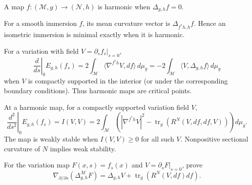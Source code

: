 \begin{definition}
\label{def:chow-iv-k12-harmonic-map}
A map $f:(\mathcal M,g)\to(\mathcal N,h)$ is harmonic when
$\Delta_{g,h}f=0$.
\end{definition}

\begin{example}
\label{ex:chow-iv-k13-minimal-immersion}
For a smooth immersion $f$, its mean curvature vector is
$\Delta_{f^*h,h}f$.  Hence an isometric immersion is minimal exactly when it
is harmonic.
\end{example}

\begin{lemma}
\label{lem:chow-iv-k14-first-variation}
For a variation with field $V=\partial_sf_s|_{s=0}$,
\[
\left.\frac{d}{ds}\right|_{0}E_{g,h}(f_s)=
2\int_{\mathcal M}\langle\nabla^{f^*h}V,df\rangle\,d\mu_g
=-2\int_{\mathcal M}\langle V,\Delta_{g,h}f\rangle\,d\mu_g
\]
when $V$ is compactly supported in the interior (or under the corresponding
boundary conditions).  Thus harmonic maps are critical points.
\end{lemma}

\begin{lemma}
\label{lem:chow-iv-k15-second-variation}
At a harmonic map, for a compactly supported variation field $V$,
\[
\left.\frac{d^2}{ds^2}\right|_0E_{g,h}(f_s)=I(V,V)
=2\int_{\mathcal M}\left(|\nabla^{f^*h}V|^2-
\operatorname{tr}_g(R^N(V,df,df,V))\right)d\mu_g.
\]
The map is weakly stable when $I(V,V)\ge0$ for all such $V$.  Nonpositive
sectional curvature of $N$ implies weak stability.
\end{lemma}

\begin{example}
\label{ex:chow-iv-k16-map-laplacian-linearization}
For the variation map $F(x,s)=f_s(x)$ and $V=\partial_sF|_{s=0}$, prove
\[
\nabla_{\partial/\partial s}(\Delta_{g,h}^{\mathcal M}F)
=\Delta_{g,h}V+\operatorname{tr}_g(R^N(V,df)df).
\]
\end{example}

